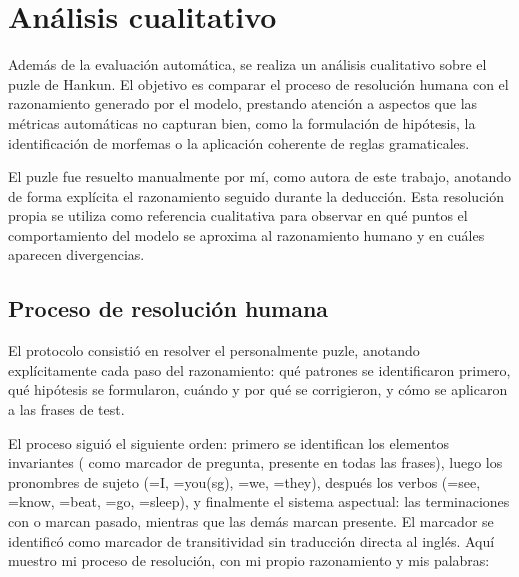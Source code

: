 \section{Análisis cualitativo}
\label{sec:cualitativo}

Además de la evaluación automática, se realiza un análisis cualitativo sobre el puzle de Hankun. El objetivo es comparar el proceso de resolución humana con el razonamiento generado por el modelo, prestando atención a aspectos que las métricas automáticas no capturan bien, como la formulación de hipótesis, la identificación de morfemas o la aplicación coherente de reglas gramaticales.

El puzle fue resuelto manualmente por mí, como autora de este trabajo, anotando de forma explícita el razonamiento seguido durante la deducción. Esta resolución propia se utiliza como referencia cualitativa para observar en qué puntos el comportamiento del modelo se aproxima al razonamiento humano y en cuáles aparecen divergencias.

\subsection{Proceso de resolución humana}

El protocolo consistió en resolver el personalmente puzle, anotando explícitamente cada paso del razonamiento: qué patrones se identificaron primero, qué hipótesis se formularon, cuándo y por qué se corrigieron, y cómo se aplicaron a las frases de test.

El proceso siguió el siguiente orden: primero se identifican los elementos invariantes
( como marcador de pregunta, presente en todas las frases), luego los pronombres
de sujeto (=I, =you(sg), =we, =they), después los
verbos (=see, =know, =beat, =go, =sleep),
y finalmente el sistema aspectual: las terminaciones con  o  marcan pasado,
mientras que las demás marcan presente. El marcador  se identificó como marcador
de transitividad sin traducción directa al inglés. Aquí muestro mi proceso de resolución, con mi propio razonamiento y mis palabras:


